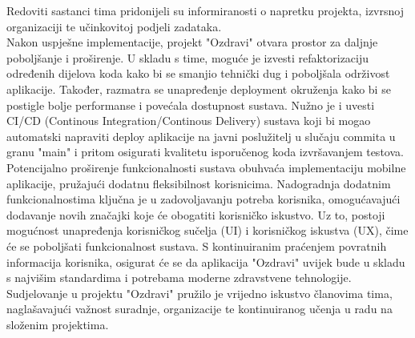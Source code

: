 		 Redoviti sastanci tima pridonijeli su informiranosti o napretku projekta, izvrsnoj organizaciji te učinkovitoj podjeli zadataka. \\
		 Nakon uspješne implementacije, projekt "Ozdravi" otvara prostor za daljnje poboljšanje i proširenje. U skladu s time, moguće je izvesti refaktorizaciju određenih dijelova koda kako bi se smanjio tehnički dug i poboljšala održivost aplikacije. Također, razmatra se unapređenje deployment okruženja kako bi se postigle bolje performanse i povećala dostupnost sustava. Nužno je i uvesti CI/CD (Continous Integration/Continous Delivery) sustava koji bi mogao automatski napraviti deploy aplikacije na javni poslužitelj u slučaju commita u granu "main" i pritom osigurati kvalitetu isporučenog koda izvršavanjem testova.
		 Potencijalno proširenje funkcionalnosti sustava obuhvaća implementaciju mobilne aplikacije, pružajući dodatnu fleksibilnost korisnicima. Nadogradnja dodatnim funkcionalnostima ključna je u zadovoljavanju potreba korisnika, omogućavajući dodavanje novih značajki koje će obogatiti korisničko iskustvo. Uz to, postoji mogućnost unapređenja korisničkog sučelja (UI) i korisničkog iskustva (UX), čime će se poboljšati funkcionalnost sustava. S kontinuiranim praćenjem povratnih informacija korisnika, osigurat će se da aplikacija "Ozdravi" uvijek bude u skladu s najvišim standardima i potrebama moderne zdravstvene tehnologije. \\
		 Sudjelovanje u projektu "Ozdravi" pružilo je vrijedno iskustvo članovima tima, naglašavajući važnost suradnje, organizacije te kontinuiranog učenja u radu na složenim projektima.
		\eject 